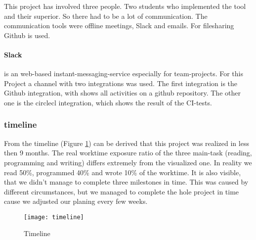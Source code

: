 This project has involved three people. Two students who implemented the tool and their superior. So there had to be a lot of communication. The communication tools were offline meetings, Slack and emails. For filesharing Github is used. 

\paragraph*{Slack} is an web-based instant-messaging-service especially for team-projects. For this Project a channel with two integrations was used. The first integration is the Github integration, with shows all activities on a github repository. The other one is the circlecl integration, which shows the result of the CI-tests. 

\subsubsection*{timeline}
From the timeline (Figure \ref{fig:timeline}) can be derived that this project was realized in less then 9 months. The real worktime exposure ratio of the three main-task (reading, programming and writing) differs extremely from the visualized one. In reality we read 50\%, programmed 40\% and wrote 10\% of the worktime. 
It is also visible, that we didn't manage to complete three milestones in time. This was caused by different circumstances, but we managed to complete the hole project in time cause we adjusted our planing every few weeks. 

\begin{figure}[!htb]
	\centering
		\texttt{[image: timeline]}
	\caption{Timeline}
	\label{fig:timeline}
\end{figure}


